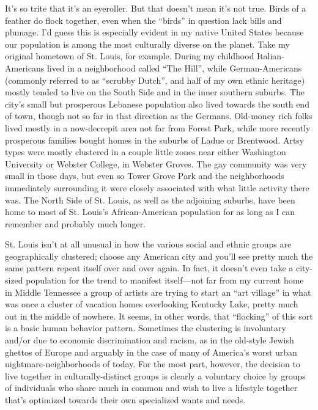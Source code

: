 
It's so trite that it's an eyeroller. But that doesn't mean it's not true. Birds of a feather do flock together, even when the ``birds'' in question lack bills and plumage. I'd guess this is especially evident in my native United States because our population is among the most culturally diverse on the planet. Take my original hometown of St. Louis, for example. During my childhood Italian-Americans lived in a neighborhood called ``The Hill'', while German-Americans (commonly referred to as ``scrubby Dutch'', and half of my own ethnic heritage) mostly tended to live on the South Side and in the inner southern suburbs. The city's small but prosperous Lebanese population also lived towards the south end of town, though not so far in that direction as the Germans. Old-money rich folks lived mostly in a now-decrepit area not far from Forest Park, while more recently prosperous families bought homes in the suburbs of Ladue or Brentwood. Artsy types were mostly clustered in a couple little zones near either Washington University or Webster College, in Webster Groves. The gay community was very small in those days, but even so Tower Grove Park and the neighborhoods immediately surrounding it were closely associated with what little activity there was. The North Side of St. Louis, as well as the adjoining suburbs, have been home to most of St. Louis's African-American population for as long as I can remember and probably much longer.

St. Louis isn't at all unusual in how the various social and ethnic groups are geographically clustered; choose any American city and you'll see pretty much the same pattern repeat itself over and over again. In fact, it doesn't even take a city-sized population for the trend to manifest itself—not far from my current home in Middle Tennessee a group of artists are trying to start an ``art village'' in what was once a cluster of vacation homes overlooking Kentucky Lake, pretty much out in the middle of nowhere. It seems, in other words, that ``flocking'' of this sort is a basic human behavior pattern. Sometimes the clustering is involuntary and/or due to economic discrimination and racism, as in the old-style Jewish ghettos of Europe and arguably in the case of many of America's worst urban nightmare-neighborhoods of today. For the most part, however, the decision to live together in culturally-distinct groups is clearly a voluntary choice by groups of individuals who share much in common and wish to live a lifestyle together that's optimized towards their own specialized wants and needs.

